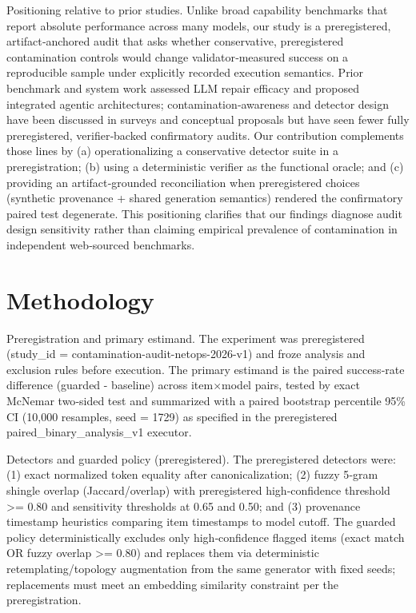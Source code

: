 \documentclass[conference]{IEEEtran}
\begin{document}
Positioning relative to prior studies. Unlike broad capability benchmarks that report absolute performance across many models, our study is a preregistered, artifact‑anchored audit that asks whether conservative, preregistered contamination controls would change validator‑measured success on a reproducible sample under explicitly recorded execution semantics. Prior benchmark and system work assessed LLM repair efficacy and proposed integrated agentic architectures; contamination‑awareness and detector design have been discussed in surveys and conceptual proposals but have seen fewer fully preregistered, verifier‑backed confirmatory audits. Our contribution complements those lines by (a) operationalizing a conservative detector suite in a preregistration; (b) using a deterministic verifier as the functional oracle; and (c) providing an artifact‑grounded reconciliation when preregistered choices (synthetic provenance + shared generation semantics) rendered the confirmatory paired test degenerate. This positioning clarifies that our findings diagnose audit design sensitivity rather than claiming empirical prevalence of contamination in independent web‑sourced benchmarks.

\section{Methodology}
Preregistration and primary estimand. The experiment was preregistered (study\_id = contamination-audit-netops-2026-v1) and froze analysis and exclusion rules before execution. The primary estimand is the paired success‑rate difference (guarded - baseline) across item\ensuremath{\times}model pairs, tested by exact McNemar two‑sided test and summarized with a paired bootstrap percentile 95\% CI (10,000 resamples, seed = 1729) as specified in the preregistered paired\_binary\_analysis\_v1 executor.

Detectors and guarded policy (preregistered). The preregistered detectors were: (1) exact normalized token equality after canonicalization; (2) fuzzy 5‑gram shingle overlap (Jaccard/overlap) with preregistered high‑confidence threshold >= 0.80 and sensitivity thresholds at 0.65 and 0.50; and (3) provenance timestamp heuristics comparing item timestamps to model cutoff. The guarded policy deterministically excludes only high‑confidence flagged items (exact match OR fuzzy overlap >= 0.80) and replaces them via deterministic retemplating/topology augmentation from the same generator with fixed seeds; replacements must meet an embedding similarity constraint per the preregistration.
\end{document}
